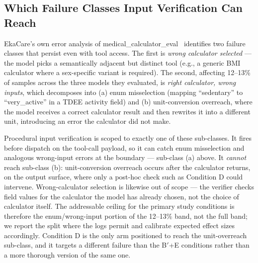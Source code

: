 \subsection{Which Failure Classes Input Verification Can Reach}
\label{sec:bg_scope}

EkaCare's own error analysis of
medical\_calculator\_eval~\citep{ekacare_error_analysis} identifies two
failure classes that persist even with tool access. The first is
\emph{wrong calculator selected} --- the model picks a semantically
adjacent but distinct tool (e.g., a generic BMI calculator where a
sex-specific variant is required). The second, affecting 12--13\% of
samples across the three models they evaluated, is \emph{right
calculator, wrong inputs}, which decomposes into (a) enum misselection
(mapping ``sedentary'' to ``very\_active'' in a TDEE activity field)
and (b) unit-conversion overreach, where the model receives a correct
calculator result and then rewrites it into a different unit,
introducing an error the calculator did not make.

Procedural input verification is scoped to exactly one of these
sub-classes. It fires before dispatch on the tool-call payload, so it
can catch enum misselection and analogous wrong-input errors at the
boundary --- sub-class (a) above. It \emph{cannot} reach sub-class (b):
unit-conversion overreach occurs after the calculator returns, on the
output surface, where only a post-hoc check such as Condition D could
intervene. Wrong-calculator selection is likewise out of scope --- the
verifier checks field values for the calculator the model has already
chosen, not the choice of calculator itself. The addressable ceiling
for the primary study conditions is therefore the enum/wrong-input
portion of the 12--13\% band, not the full band; we report the split
where the logs permit and calibrate expected effect sizes accordingly.
Condition D is the only arm positioned to reach the unit-overreach
sub-class, and it targets a different failure than the B$'$+E
conditions rather than a more thorough version of the same one.
